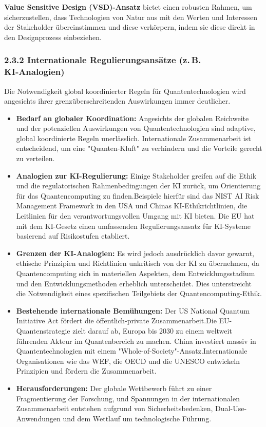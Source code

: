 \textbf{Value Sensitive Design (VSD)-Ansatz} bietet einen robusten Rahmen, um sicherzustellen, dass Technologien von Natur aus mit den Werten und Interessen der Stakeholder übereinstimmen und diese verkörpern, indem sie diese direkt in den Designprozess einbeziehen.


\subsubsection{2.3.2 Internationale Regulierungsansätze (z. B. KI‑Analogien)}
Die Notwendigkeit global koordinierter Regeln für Quantentechnologien wird angesichts ihrer grenzüberschreitenden Auswirkungen immer deutlicher.

\begin{itemize}
    \item \textbf{Bedarf an globaler Koordination:} Angesichts der globalen Reichweite und der potenziellen Auswirkungen von Quantentechnologien sind adaptive, global koordinierte Regeln unerlässlich. Internationale Zusammenarbeit ist entscheidend, um eine "Quanten-Kluft" zu verhindern und die Vorteile gerecht zu verteilen.
    \item \textbf{Analogien zur KI-Regulierung:} Einige Stakeholder greifen auf die Ethik und die regulatorischen Rahmenbedingungen der KI zurück, um Orientierung für das Quantencomputing zu finden.Beispiele hierfür sind das NIST AI Risk Management Framework in den USA und Chinas KI-Ethikrichtlinien, die Leitlinien für den verantwortungsvollen Umgang mit KI bieten. Die EU hat mit dem KI-Gesetz einen umfassenden Regulierungsansatz für KI-Systeme basierend auf Risikostufen etabliert.
    \item \textbf{Grenzen der KI-Analogien:} Es wird jedoch ausdrücklich davor gewarnt, ethische Prinzipien und Richtlinien unkritisch von der KI zu übernehmen, da Quantencomputing sich in materiellen Aspekten, dem Entwicklungsstadium und den Entwicklungsmethoden erheblich unterscheidet. Dies unterstreicht die Notwendigkeit eines spezifischen Teilgebiets der Quantencomputing-Ethik.
    \item \textbf{Bestehende internationale Bemühungen:} Der US National Quantum Initiative Act fördert die öffentlich-private Zusammenarbeit.Die EU-Quantenstrategie zielt darauf ab, Europa bis 2030 zu einem weltweit führenden Akteur im Quantenbereich zu machen. China investiert massiv in Quantentechnologien mit einem "Whole-of-Society"-Ansatz.Internationale Organisationen wie das WEF, die OECD und die UNESCO entwickeln Prinzipien und fördern die Zusammenarbeit.
\end{itemize}
\begin{itemize}
    \item \textbf{Herausforderungen:} Der globale Wettbewerb führt zu einer Fragmentierung der Forschung, und Spannungen in der internationalen Zusammenarbeit entstehen aufgrund von Sicherheitsbedenken, Dual-Use-Anwendungen und dem Wettlauf um technologische Führung.
\end{itemize}

